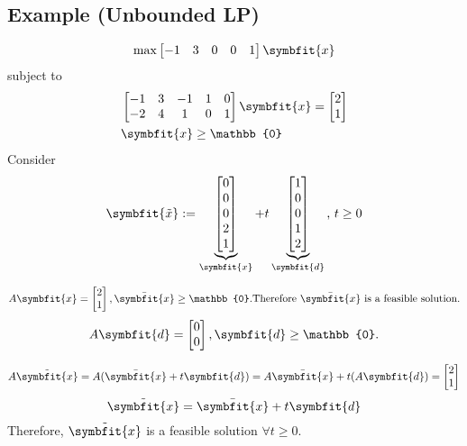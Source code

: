 \subsection{Example (Unbounded LP)}
\[\max 
\begin{bmatrix}
    -1 & 3 & 0 & 0 & 1
\end{bmatrix}\symbfit{x}\]
subject to
\begin{align*}
    &\begin{bmatrix}
        -1 & 3 & -1 & 1 & 0\\
        -2 & 4 & 1 & 0 & 1
    \end{bmatrix}
    \symbfit{x}
    =
    \begin{bmatrix}
        2\\
        1
    \end{bmatrix}\\
    &\symbfit{x}\ge \mathbb{0}
\end{align*}
Consider
\[\symbfit{\tilde{x}}:=
\underbrace{\begin{bmatrix}
    0\\
    0\\
    0\\
    2\\
    1  
\end{bmatrix}}_{\symbfit{x}}
+
t
\underbrace{\begin{bmatrix}
    1\\
    0\\
    0\\
    1\\
    2
\end{bmatrix}}_{\symbfit{d}} \text{, } t\ge 0
\]

\[
    A\symbfit{x}=
    \begin{bmatrix}
        2\\
        1
    \end{bmatrix}, \bar{\symbfit{x}}\ge \mathbb{0}.\text{Therefore $\bar{\symbfit{x}}$ is a feasible solution.}
\]
\[
    A\symbfit{d}=\begin{bmatrix}
        0\\
        0
    \end{bmatrix}, \symbfit{d}\ge \mathbb{0}.\\
\]

\[A\tilde{\symbfit{x}}=A(\bar{\symbfit{x}}+t\symbfit{d})=A\bar{\symbfit{x}}+t(A\symbfit{d})=
\begin{bmatrix}
    2\\
    1
\end{bmatrix}\]
\[\tilde{\symbfit{x}}=\bar{\symbfit{x}}+t\symbfit{d}\]
Therefore, $\tilde{\symbfit{x}}$ is a feasible solution $\forall t\ge 0$.


